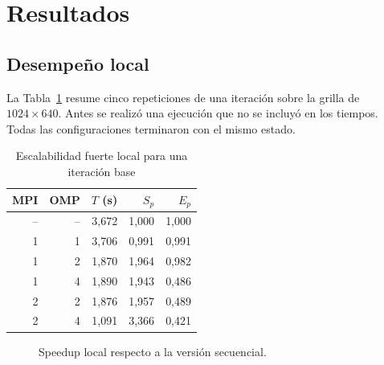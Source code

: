 \section{Resultados}

\subsection{Desempeño local}

La Tabla~\ref{tab:resultados-locales} resume cinco repeticiones de una iteración sobre la grilla de $1024\times640$. Antes se realizó una ejecución que no se incluyó en los tiempos. Todas las configuraciones terminaron con el mismo estado.

\begin{table}[ht]
\centering
\caption{Escalabilidad fuerte local para una iteración base}
\label{tab:resultados-locales}
\begin{tabular}{rrrrr}
\toprule
MPI & OMP & $T$ (s) & $S_p$ & $E_p$ \\
\midrule
-- & -- & 3,672 & 1,000 & 1,000 \\
1 & 1 & 3,706 & 0,991 & 0,991 \\
1 & 2 & 1,870 & 1,964 & 0,982 \\
1 & 4 & 1,890 & 1,943 & 0,486 \\
2 & 2 & 1,876 & 1,957 & 0,489 \\
2 & 4 & 1,091 & 3,366 & 0,421 \\
\bottomrule
\end{tabular}
\end{table}

\begin{figure}[ht]
\centering
{}
\caption{Speedup local respecto a la versión secuencial.}
\label{fig:speedup-local}
\end{figure}

